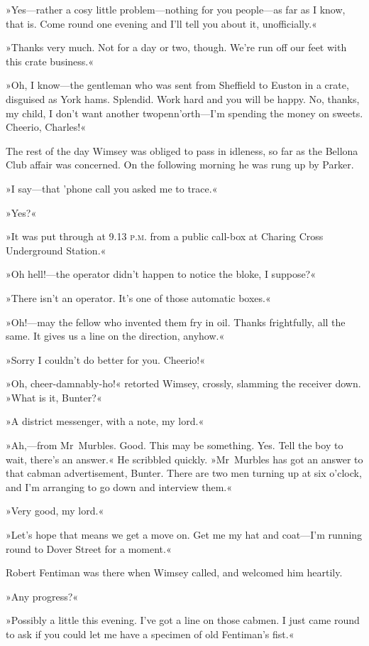 »Yes—rather a cosy little problem—nothing for you people—as far as I know, that is. Come round one evening and I'll tell you about it, unofficially.«

»Thanks very much. Not for a day or two, though. We're run off our feet with this crate business.«

»Oh, I know—the gentleman who was sent from Sheffield to Euston in a crate, disguised as York hams. Splendid. Work hard and you will be happy. No, thanks, my child, I don't want another twopenn'orth—I'm spending the money on sweets. Cheerio, Charles!«

The rest of the day Wimsey was obliged to pass in idleness, so far as the Bellona Club affair was concerned. On the following morning he was rung up by Parker.

»I say—that 'phone call you asked me to trace.«

»Yes?«

»It was put through at 9.13 \textsc{p.m.} from a public call-box at Charing Cross Underground Station.«

»Oh hell!—the operator didn't happen to notice the bloke, I suppose?«

»There isn't an operator. It's one of those automatic boxes.«

»Oh!—may the fellow who invented them fry in oil. Thanks frightfully, all the same. It gives us a line on the direction, anyhow.«

»Sorry I couldn't do better for you. Cheerio!«

»Oh, cheer-damnably-ho!« retorted Wimsey, crossly, slamming the receiver down. »What is it, Bunter?«

»A district messenger, with a note, my lord.«

»Ah,—from Mr~Murbles. Good. This may be something. Yes. Tell the boy to wait, there's an answer.« He scribbled quickly. »Mr~Murbles has got an answer to that cabman advertisement, Bunter. There are two men turning up at six o'clock, and I'm arranging to go down and interview them.«

»Very good, my lord.«

»Let's hope that means we get a move on. Get me my hat and coat—I'm running round to Dover Street for a moment.«

Robert Fentiman was there when Wimsey called, and welcomed him heartily.

»Any progress?«

»Possibly a little this evening. I've got a line on those cabmen. I just came round to ask if you could let me have a specimen of old Fentiman's fist.«

